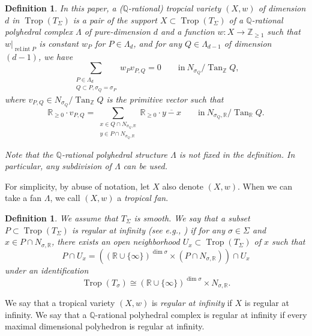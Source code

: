 \documentclass[12pt,a4]{amsart}
\newtheorem{dfn}[thm]{Definition}
\def\R{\mathbb{R}}
\def\Z{\mathbb{Z}}
\def\Q{\mathbb{Q}}
\def\Tan{\mathop{\mathrm{Tan}}\nolimits}
\def\Trop{\mathop{\mathrm{trop}}\nolimits}
\def\relint{\mathop{\mathrm{rel.int}}\nolimits}
\def\Trop{\mathop{\mathrm{Trop}}\nolimits}
\numberwithin{equation}{section}
\numberwithin{figure}{section}
\begin{document}
  \begin{dfn}
  \label{def:def of tropical variety}
  In this paper, 
  a ($\Q$-rational) \emph{tropcial variety} 
  $(X, w )$
   of dimension $d$
  in $\Trop(T_{\Sigma})$ 
   is a pair of 
   the support 
    $X \subset \Trop (T_{\Sigma})$
    of 
  a $\Q$-rational polyhedral complex $\Lambda$ of pure-dimension $d$ 
  and 
  a function $w \colon X \to \Z_{\geq 1}$
  such that 
  $w |_{\relint P}$ is constant $w_P$ for $P \in \Lambda_d$,
  and 
  for any $Q\in\Lambda_{d-1}$ of dimension $(d-1)$, we have 
  $$
  \sum_{\substack{P\in\Lambda_{d}\\
  Q\subset P,\sigma_{Q}=\sigma_{P}
  }
  }w_{P}v_{P,Q}=0 
  \qquad  \text{in} \ N_{\sigma_{Q}}/\Tan_{\Z}Q,
   $$ 
   where $v_{P,Q}\in N_{\sigma_{Q}}/\Tan_{\Z}Q$
  is the primitive vector such that 
  $$\R_{\geq0}\cdot v_{P,Q}
   =  \sum_{ \substack{x \in Q \cap N_{\sigma_Q, \R} \\ 
           y \in P \cap N_{\sigma_Q,\R} }} 
           \R_{\geq 0} \cdot \overline{y-x} 
    \qquad \text{in} \ N_{\sigma_{Q},\R}/\Tan_{\R}Q.
   $$ 

   Note that 
   the $\Q$-rational polyhedral structure $\Lambda$ 
   is \emph{not} fixed in the definition.
   In particular, any subdivision of $\Lambda$ can be used.
  \end{dfn}
   For simplicity, by abuse of notation, let $X$ also denote $(X,w)$.
   When we can take a fan $\Lambda$, we call $(X,w)$ a \emph{tropical fan}.


  \begin{dfn}
  \label{def:regular at infinity} 
  We assume that $T_{\Sigma}$ is smooth.
  We say that a subset $P\subset\Trop(T_{\Sigma})$
  is \emph{regular at infinity} (see e.g., \cite[Definition 1.2]{MikhalkinZharkovTropicaleignewaveandintermediatejacobians2014}) 
  if 
   for any $\sigma \in\Sigma$ and $x\in P\cap N_{\sigma ,\R}$, there exists
  an open neighborhood $U_{x}\subset\Trop(T_{\Sigma})$ of $x$ such
  that 
  $$P\cap U_{x}=
  ( (\R \cup \{ \infty \})^{\dim \sigma  } \times (P\cap N_{\sigma ,\R})   )
  \cap U_{x}
  $$ 
   under an identification 
   $$
  \Trop(T_{\sigma})\cong(\R\cup\{\infty\})^{\dim\sigma}
   \times N_{\sigma, \R} .
  $$
  \end{dfn}

  We say that a tropical variety $(X,w)$ is \emph{regular at infinity} if $X$
   is regular at infinity. 
  We say that a $\Q$-rational polyhedral complex is regular at infinity 
   if every maximal dimensional polyhedron is regular at infinity. 
\end{document}
